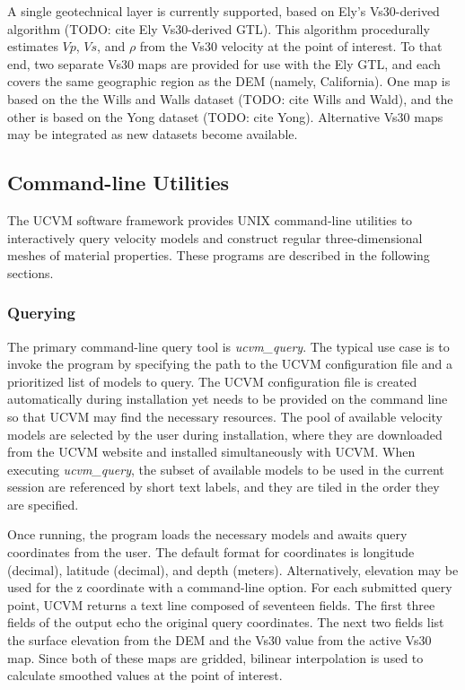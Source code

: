A single geotechnical layer is currently supported, based on Ely's Vs30-derived algorithm (TODO: cite Ely Vs30-derived GTL). This algorithm procedurally estimates $Vp$, $Vs$, and $\rho$ from the Vs30 velocity at the point of interest. To that end, two separate Vs30 maps are provided for use with the Ely GTL, and each covers the same geographic region as the DEM (namely, California). One map is based on the the Wills and Walls dataset (TODO: cite Wills and Wald), and the other is based on the Yong dataset (TODO: cite Yong). Alternative Vs30 maps may be integrated as new datasets become available. 

\subsection{Command-line Utilities}

The UCVM software framework provides UNIX command-line utilities to interactively query velocity models and construct regular three-dimensional meshes of material properties. These programs are described in the following sections.

\subsubsection{Querying}

The primary command-line query tool is \emph{ucvm\_query}. The typical use case is to invoke the program by specifying the path to the UCVM configuration file and a prioritized list of models to query. The UCVM configuration file is created automatically during installation yet needs to be provided on the command line so that UCVM may find the necessary resources. The pool of available velocity models are selected by the user during installation, where they are downloaded from the UCVM website and installed simultaneously with UCVM. When executing \emph{ucvm\_query}, the subset of available models to be used in the current session are referenced by short text labels, and they are tiled in the order they are specified.

Once running, the program loads the necessary models and awaits query coordinates from the user. The default format for coordinates is longitude (decimal), latitude (decimal), and depth (meters). Alternatively, elevation may be used for the z coordinate with a command-line option. For each submitted query point, UCVM returns a text line composed of seventeen fields. The first three fields of the output echo the original query coordinates. The next two fields list the surface elevation from the DEM and the Vs30 value from the active Vs30 map. Since both of these maps are gridded, bilinear interpolation is used to calculate smoothed values at the point of interest.

